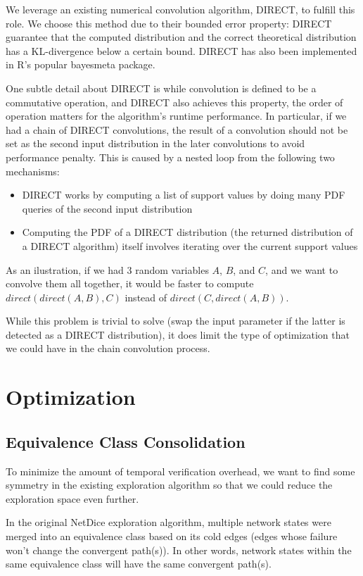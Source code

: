 \documentclass[10pt,sigconf,letterpaper,anonymous,nonacm]{acmart}
\begin{document}
We leverage an existing numerical convolution algorithm, DIRECT, to fulfill this role.
We choose this method due to their bounded error property: DIRECT guarantee that the computed 
distribution and the correct theoretical distribution has a KL-divergence below a certain bound.
DIRECT has also been implemented in R's popular bayesmeta package.

One subtle detail about DIRECT is while convolution is defined to be a commutative operation, and 
DIRECT also achieves this property, the order of operation matters for the algorithm's runtime 
performance.
In particular, if we had a chain of DIRECT convolutions, the result of a convolution should not be set 
as the second input distribution in the later convolutions to avoid performance penalty.
This is caused by a nested loop from the following two mechanisms:
\begin{itemize}
    \item DIRECT works by computing a list of support values by doing many PDF queries of the second input
        distribution
    \item Computing the PDF of a DIRECT distribution (the returned distribution of a DIRECT 
        algorithm) itself involves iterating over the current support values
\end{itemize}

As an ilustration, if we had 3 random variables $A$, $B$, and  $C$, and we want 
to convolve them all together, it would be faster to compute $direct(direct(A, B), C)$ instead of 
$direct(C, direct(A, B))$.

While this problem is trivial to solve (swap the input parameter if the latter is detected as a 
DIRECT distribution), it does limit the type of optimization that we could have in the chain convolution 
process.

\section{Optimization}
\subsection{Equivalence Class Consolidation}
To minimize the amount of temporal verification overhead, we want to find some symmetry in the 
existing exploration algorithm so that we could reduce the exploration space even further.

In the original NetDice exploration algorithm, multiple network states were merged into an equivalence 
class based on its cold edges (edges whose failure won't change the convergent path(s)).
In other words, network states within the same equivalence class will have the same convergent path(s).
\end{document}
